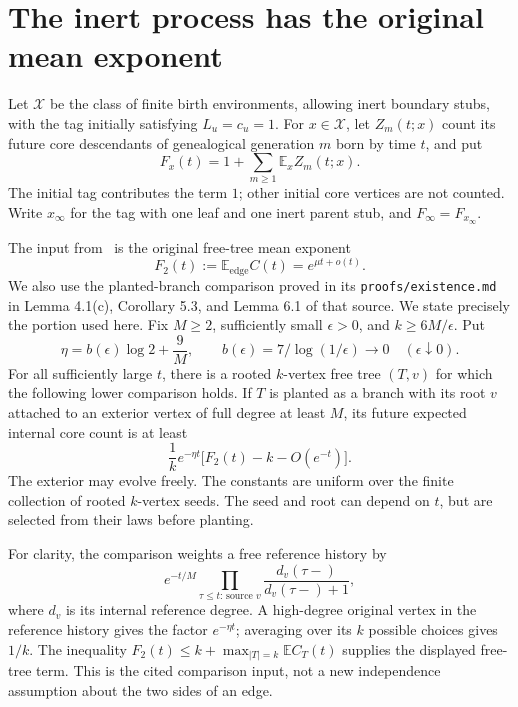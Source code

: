 \section{The inert process has the original mean exponent}
\label{gs:inert-exponent-section}

Let $\mathcal X$ be the class of finite birth environments, allowing
inert boundary stubs, with the tag initially satisfying $L_u=c_u=1$.
For $x\in\mathcal X$, let $Z_m(t;x)$ count its future core descendants
of genealogical generation $m$ born by time $t$, and put
\[
 F_x(t)=1+\sum_{m\ge1}\mathbb E_x Z_m(t;x).
\]
The initial tag contributes the term $1$; other initial core vertices
are not counted. Write $x_\infty$ for the tag with one leaf and one
inert parent stub, and $F_\infty=F_{x_\infty}$.

The input from~\cite{Uzay} is the original free-tree mean exponent
\[
 F_2(t):=\mathbb E_{\mathrm{edge}} C(t)
       =e^{\mu t+o(t)}.
\]
We also use the planted-branch comparison proved in its
\texttt{proofs/existence.md} in Lemma 4.1(c), Corollary 5.3, and Lemma 6.1 of that source. We state precisely the portion used here.
Fix $M\ge2$, sufficiently small $\epsilon>0$, and
$k\ge6M/\epsilon$. Put
\[
 \eta=b(\epsilon)\log2+\frac9M,
 \qquad b(\epsilon)=7/\log(1/\epsilon)\longrightarrow0
       \quad(\epsilon\downarrow0).
\]
For all sufficiently large $t$, there is a rooted $k$-vertex free tree
$(T,v)$ for which the following lower comparison holds. If $T$ is
planted as a branch with its root $v$ attached to an exterior vertex
of full degree at least $M$, its future expected internal core count
is at least
\begin{equation}\label{gs:planting-input}
 \frac1k e^{-\eta t}
       \bigl[F_2(t)-k-O(e^{-t})\bigr].
\end{equation}
The exterior may evolve freely. The constants are uniform over the
finite collection of rooted $k$-vertex seeds. The seed and root can
depend on $t$, but are selected from their laws before planting.

For clarity, the comparison weights a free reference history by
\[
 e^{-t/M}\prod_{\tau\le t:\,\text{source }v}
       \frac{d_v(\tau-)}{d_v(\tau-)+1},
\]
where $d_v$ is its internal reference degree. A high-degree original
vertex in the reference history gives the factor $e^{-\eta t}$;
averaging over its $k$ possible choices gives $1/k$. The inequality
$F_2(t)\le k+\max_{|T|=k}\mathbb E C_T(t)$ supplies the displayed
free-tree term. This is the cited comparison input, not a new
independence assumption about the two sides of an edge.

